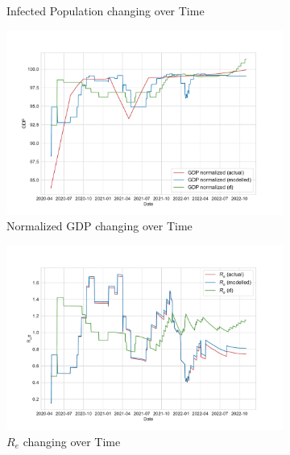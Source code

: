 \documentclass[tikz,fleqn,12pt]{wlscirep}
\begin{document}
\begin{figure}[htbp!]
\begin{subfigure}[t]{0.48\textwidth}
    \caption{Infected Population changing over Time}
    \label{fig:176647_rl_i}
  \end{subfigure}
  \hfill
  \begin{subfigure}[t]{0.48\textwidth}
    \centering
    \includegraphics[width=\linewidth]{images/176647/rl_gdp.pdf}
    \caption{Normalized GDP changing over Time}
    \label{fig:176647_rl_gdp}
  \end{subfigure}
  \hfill
  \begin{subfigure}[t]{0.48\textwidth}
    \centering
    \includegraphics[width=\linewidth]{images/176647/rl_r_eff.pdf}
    \caption{$R_e$ changing over Time}
    \label{fig:176647_rl_r_eff}
  \end{subfigure}
  \hfill
  \begin{subfigure}[t]{0.48\textwidth}
    \centering

\end{subfigure}
\end{figure}
\end{document}
